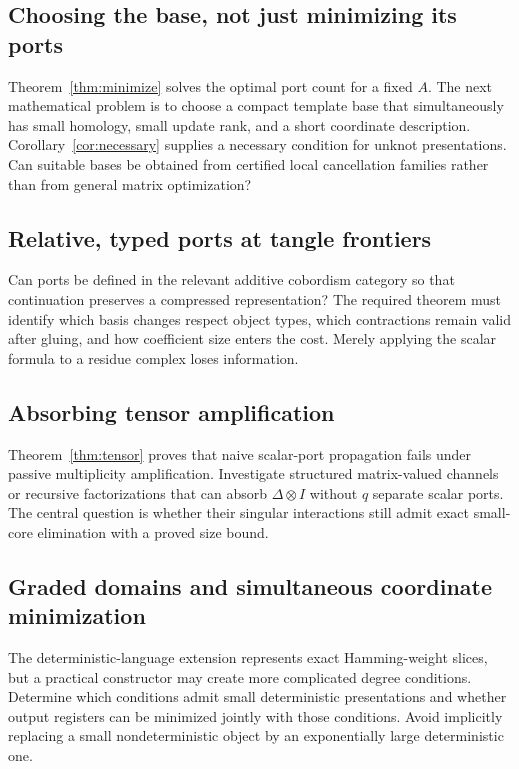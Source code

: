 \documentclass[11pt,letterpaper]{article}
\theoremstyle{definition}
\theoremstyle{remark}
\numberwithin{equation}{section}
\begin{document}
\subsection{Choosing the base, not just minimizing its ports}
Theorem~\ref{thm:minimize} solves the optimal port count for a fixed $A$.
The next mathematical problem is to choose a compact template base that
simultaneously has small homology, small update rank, and a short
coordinate description. Corollary~\ref{cor:necessary} supplies a necessary
condition for unknot presentations. Can suitable bases be obtained from
certified local cancellation families rather than from general matrix
optimization?

\subsection{Relative, typed ports at tangle frontiers}
Can ports be defined in the relevant additive cobordism category so that
continuation preserves a compressed representation? The required theorem
must identify which basis changes respect object types, which contractions
remain valid after gluing, and how coefficient size enters the cost.
Merely applying the scalar formula to a residue complex loses information.

\subsection{Absorbing tensor amplification}
Theorem~\ref{thm:tensor} proves that naive scalar-port propagation fails
under passive multiplicity amplification. Investigate structured
matrix-valued channels or recursive factorizations that can absorb
$\Delta\otimes I$ without $q$ separate scalar ports. The central question
is whether their singular interactions still admit exact small-core
elimination with a proved size bound.

\subsection{Graded domains and simultaneous coordinate minimization}
The deterministic-language extension represents exact Hamming-weight
slices, but a practical constructor may create more complicated degree
conditions. Determine which conditions admit small deterministic
presentations and whether output registers can be minimized jointly with
those conditions. Avoid implicitly replacing a small nondeterministic
object by an exponentially large deterministic one.
\end{document}
